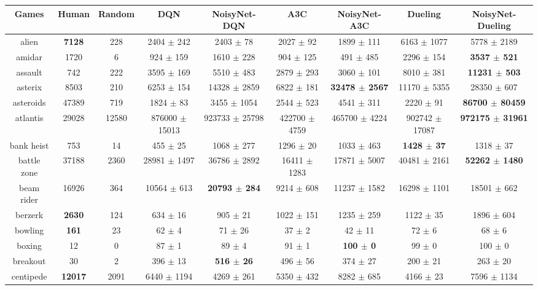 \documentclass{article}
\begin{document}
\begin{table}[!ht]
\centering
\tiny
\begin{tabular}{|c|c|c|c|c|c|c|c|c|}
\hline
 Games & Human & Random & DQN & NoisyNet-DQN & A3C & NoisyNet-A3C & Dueling & NoisyNet-Dueling \\
\hline
 alien & \bf{7128} & 228 & 2404 $\pm$ 242 & 2403 $\pm$ 78 & 2027 $\pm$ 92 & 1899 $\pm$ 111 & 6163 $\pm$ 1077 & 5778 $\pm$ 2189 \\
 amidar & 1720 & 6 & 924 $\pm$ 159 & 1610 $\pm$ 228 & 904 $\pm$ 125 & 491 $\pm$ 485 & 2296 $\pm$ 154 & \bf{3537 $\pm$ 521} \\
 assault & 742 & 222 & 3595 $\pm$ 169 & 5510 $\pm$ 483 & 2879 $\pm$ 293 & 3060 $\pm$ 101 & 8010 $\pm$ 381 & \bf{11231 $\pm$ 503} \\
 asterix & 8503 & 210 & 6253 $\pm$ 154 & 14328 $\pm$ 2859 & 6822 $\pm$ 181 & \bf{32478 $\pm$ 2567} & 11170 $\pm$ 5355 & 28350 $\pm$ 607 \\
 asteroids & 47389 & 719 & 1824 $\pm$ 83 & 3455 $\pm$ 1054 & 2544 $\pm$ 523 & 4541 $\pm$ 311 & 2220 $\pm$ 91 & \bf{86700 $\pm$ 80459} \\
 atlantis & 29028 & 12580 & 876000 $\pm$ 15013 & 923733 $\pm$ 25798 & 422700 $\pm$ 4759 & 465700 $\pm$ 4224 & 902742 $\pm$ 17087 & \bf{972175 $\pm$ 31961} \\
 bank heist & 753 & 14 & 455 $\pm$ 25 & 1068 $\pm$ 277 & 1296 $\pm$ 20 & 1033 $\pm$ 463 & \bf{1428 $\pm$ 37} & 1318 $\pm$ 37 \\
 battle zone & 37188 & 2360 & 28981 $\pm$ 1497 & 36786 $\pm$ 2892 & 16411 $\pm$ 1283 & 17871 $\pm$ 5007 & 40481 $\pm$ 2161 & \bf{52262 $\pm$ 1480} \\
 beam rider & 16926 & 364 & 10564 $\pm$ 613 & \bf{20793 $\pm$ 284} & 9214 $\pm$ 608 & 11237 $\pm$ 1582 & 16298 $\pm$ 1101 & 18501 $\pm$ 662 \\
 berzerk & \bf{2630} & 124 & 634 $\pm$ 16 & 905 $\pm$ 21 & 1022 $\pm$ 151 & 1235 $\pm$ 259 & 1122 $\pm$ 35 & 1896 $\pm$ 604 \\
 bowling & \bf{161} & 23 & 62 $\pm$ 4 & 71 $\pm$ 26 & 37 $\pm$ 2 & 42 $\pm$ 11 & 72 $\pm$ 6 & 68 $\pm$ 6 \\
 boxing & 12 & 0 & 87 $\pm$ 1 & 89 $\pm$ 4 & 91 $\pm$ 1 & \bf{100 $\pm$ 0} & 99 $\pm$ 0 & 100 $\pm$ 0 \\
 breakout & 30 & 2 & 396 $\pm$ 13 & \bf{516 $\pm$ 26} & 496 $\pm$ 56 & 374 $\pm$ 27 & 200 $\pm$ 21 & 263 $\pm$ 20 \\
 centipede & \bf{12017} & 2091 & 6440 $\pm$ 1194 & 4269 $\pm$ 261 & 5350 $\pm$ 432 & 8282 $\pm$ 685 & 4166 $\pm$ 23 & 7596 $\pm$ 1134 \\

\end{tabular}
\end{table}
\end{document}
